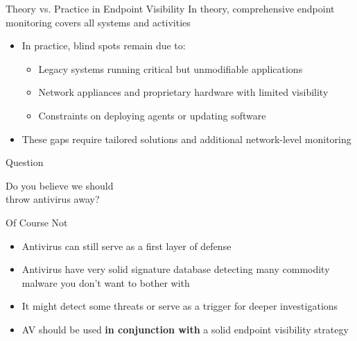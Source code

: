 \documentclass[12pt,aspectratio=169, colorlinks=true, linkcolor=circlBlue]{beamer}
\begin{document}
\begin{frame}{Theory vs. Practice in Endpoint Visibility}
	In theory, comprehensive endpoint monitoring covers all systems and activities
	\begin{itemize}
		\item In practice, blind spots remain due to:
		      \begin{itemize}
			      \item Legacy systems running critical but unmodifiable applications
			      \item Network appliances and proprietary hardware with limited visibility
			      \item Constraints on deploying agents or updating software
		      \end{itemize}
		\item These gaps require tailored solutions and additional network-level monitoring
	\end{itemize}

\end{frame}

\begin{frame}{Question}
	\begin{center}
		\Huge Do you believe we should\\
		throw antivirus away?
	\end{center}
\end{frame}

\begin{frame}{Of Course Not}
	\begin{itemize}
		\item Antivirus can still serve as a first layer of defense
		\item Antivirus have very solid signature database detecting many commodity malware you don't want to bother with
		\item It might detect some threats or serve as a trigger for deeper investigations
		\item AV should be used \textbf{in conjunction with} a solid endpoint visibility strategy
	\end{itemize}

\end{frame}
\end{document}
